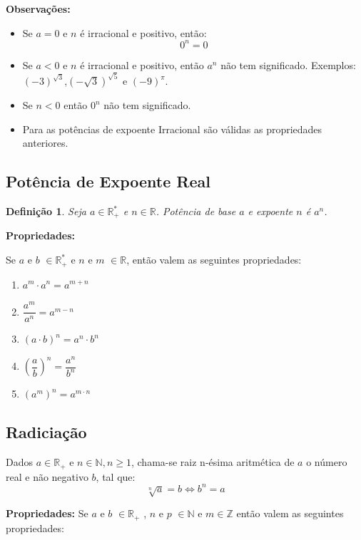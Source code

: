 \textbf{Observações:}
\begin{itemize}
\item Se $a=0$ e $n$ é irracional e positivo, então:
$$ 0^n = 0$$ 
\item Se $a < 0 $ e $n$ é irracional e positivo, então $a^n$ não tem significado. Exemplos: $(-3)^{\sqrt{3}}$,$(-\sqrt{3})^{\sqrt{5}}$ e $(-9)^{\pi}$.
\item Se $n< 0$ então $0^n$ não tem significado.
\item Para as potências de expoente Irracional são válidas as propriedades anteriores.

\end{itemize}



\subsection{Potência de Expoente Real}
	
\newtheorem{definicao}{Definição}
\begin{definicao}
	Seja $a \in \mathbb{R}^*_+ $ e $ n \in \mathbb{R}$. Potência de base $a$ e expoente $n$ é  $a^n$.	
\end{definicao}

\textbf{Propriedades:}

Se $a$ e $b$ $ \in \mathbb{R}^*_+$ e  $n$ e $ m$ $ \in \mathbb{R}$, então valem as seguintes propriedades:

\begin{enumerate}
\item $ a^m \cdot a^n = a^{m+n}$
\item $\dfrac{a^m}{a^n} = a^{m-n}$
\item $(a\cdot b)^n = a^n \cdot b^n$
\item $\left(\dfrac{a}{b}\right)^n = \dfrac{a^n}{b^n} $
\item $(a^m)^n = a^{m\cdot n}$
\end{enumerate}

\subsection{Radiciação}

Dados $a \in \mathbb{R}_+$ e $n \in \mathbb{N}, n \geq 1$, chama-se raiz n-ésima aritmética de $a$ o número real e não negativo $b$, tal que:
$$\sqrt[n]{a} = b \Leftrightarrow b^n = a$$


\textbf{Propriedades:}
Se $a$ e $b$ $ \in \mathbb{R}_+$ , $n$ e $ p$ $ \in \mathbb{N}$ e $m \in \mathbb{Z}$ então valem as seguintes propriedades:

